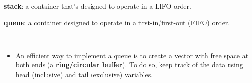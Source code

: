 \documentclass[7pt, twocolumn]{extarticle}
\newcommand{\myinline}[1]{\lstinline[basicstyle={\fontsize{5pt}{6}\ttfamily}]{#1}}
\begin{document}
\begin{small}

\begin{minipage}[h]{4.0cm}
   \textbf{stack}: a container that's designed to operate in a LIFO order.

   \textbf{queue}: a container designed to operate in a first-in/first-out (FIFO) order.
    \end{minipage}
    \hspace{0pt}
   \begin{minipage}[h]{6.2cm} 
       \setlength\cellspacetoplimit{1.5pt}
\setlength\cellspacebottomlimit{1.5pt}
{\setlength{\tabcolsep}{0.4em}
} \\
    \end{minipage}
    
\begin{itemize}[leftmargin=*,align=parleft]
\setlength\itemsep{0pt}
\item[\textcolor{info}{{\faInfoCircle}}] An efficient way to implement a queue is to create a vector with free space at both ends (a \textbf{ring/circular buffer}). To do so, keep track of the data using head (inclusive) and tail (exclusive) variables. 
\end{itemize}


\end{small}
\end{document}
